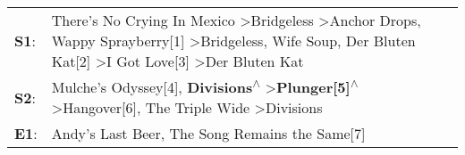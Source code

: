 \begin{supertabular}{p{0.03\textwidth}p{0.92\textwidth}}
 \textbf{S1}:  &  There's No Crying In Mexico\textsuperscript{} \textgreater \enspace Bridgeless\textsuperscript{} \textgreater \enspace Anchor Drops\textsuperscript{}, \enspace Wappy Sprayberry[1]\textsuperscript{} \textgreater \enspace Bridgeless\textsuperscript{}, \enspace Wife Soup\textsuperscript{}, \enspace Der Bluten Kat[2]\textsuperscript{} \textgreater \enspace I Got Love[3]\textsuperscript{} \textgreater \enspace Der Bluten Kat\textsuperscript{}  \enspace  \\
 \textbf{S2}:  &                                                                                                                                         Mulche's Odyssey[4]\textsuperscript{}, \enspace \textbf{Divisions\textsuperscript{$\wedge$}} \textgreater \enspace \textbf{Plunger[5]\textsuperscript{$\wedge$}} \textgreater \enspace Hangover[6]\textsuperscript{}, \enspace The Triple Wide\textsuperscript{} \textgreater \enspace Divisions\textsuperscript{}  \enspace  \\
 \textbf{E1}:  &                                                                                                                                                                                                                                                                                                                                                                Andy's Last Beer\textsuperscript{}, \enspace The Song Remains the Same[7]\textsuperscript{}  \enspace  \\
\end{supertabular}
